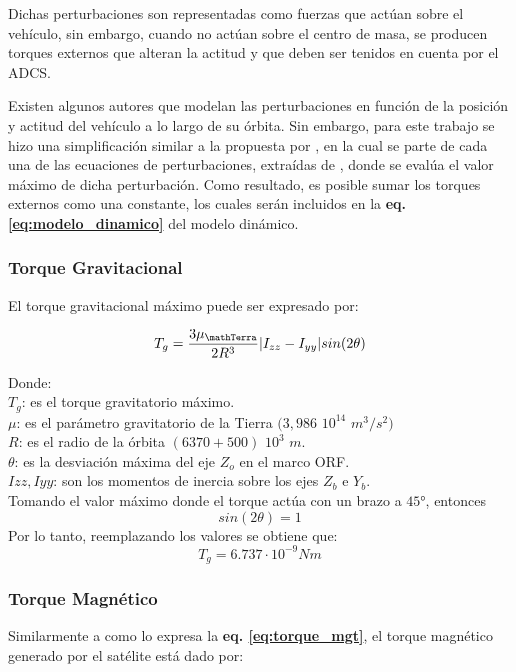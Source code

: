 Dichas perturbaciones son representadas como fuerzas que actúan sobre el vehículo, sin embargo, cuando no actúan sobre el centro de masa, se producen torques externos que alteran la actitud y que deben ser tenidos en cuenta por el ADCS.

Existen algunos autores \cite{zapf2006robust}\cite{Andresen2005} que modelan las perturbaciones en función de la posición y actitud del vehículo a lo largo de su órbita. Sin embargo, para este trabajo se hizo una simplificación similar a la propuesta por \cite{tes:Sorolla2019}, en la cual se parte de cada una de las ecuaciones de perturbaciones, extraídas de \cite{hughes2012spacecraft}, donde se evalúa el valor máximo de dicha perturbación. Como resultado, es posible sumar los torques externos como una constante, los cuales serán incluidos en la \textbf{eq. \ref{eq:modelo_dinamico}} del modelo dinámico.

\subsubsection{Torque Gravitacional}
\hfill \break
El torque gravitacional máximo puede ser expresado por:

\begin{equation}
T_g = \frac{3\mu_\mathTerra}{2R^3}\lvert I_{zz} -I_{yy}\rvert sin(2\theta)\label{eq:torque_grav}
\end{equation}

\noindent Donde:\\
$T_g$: es el torque gravitatorio máximo.\\
$\mu$: es el parámetro gravitatorio de la Tierra $(3,986$ $10^{14}$ $ m^3/s^2)$\\
$R$: es el radio de la órbita $(6370 + 500)$ $10^3$ $m$.\\
$\theta$: es la desviación máxima del eje $Z_o$ en el marco ORF.\\
$Izz, Iyy$: son los momentos de inercia sobre los ejes $Z_b$ e $Y_b$.\\

\noindent Tomando el valor máximo donde el torque actúa con un brazo a $45°$, entonces 
$$sin(2\theta) = 1$$
Por lo tanto, reemplazando los valores se obtiene que: 
$$T_g = 6.737\cdot10^{-9} Nm$$

\subsubsection{Torque Magnético}
\hfill \break
Similarmente a como lo expresa la \textbf{eq. \ref{eq:torque_mgt}}, el torque magnético generado por el satélite está dado por:

